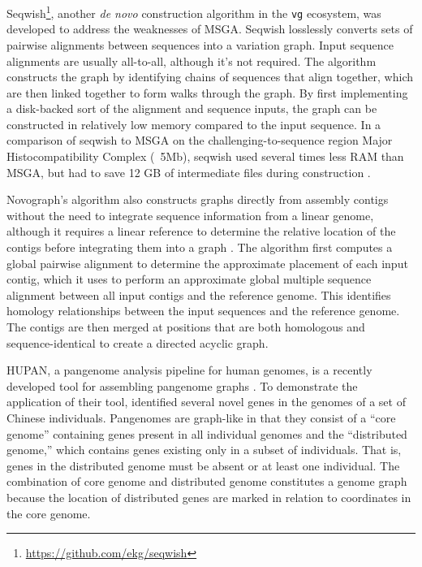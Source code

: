 Seqwish\footnote{\url{https://github.com/ekg/seqwish}}, another \textit{de novo} construction algorithm in the \texttt{vg} ecosystem, was developed to address the weaknesses of MSGA.
Seqwish losslessly converts sets of pairwise alignments between sequences into a variation graph.
Input sequence alignments are usually all-to-all, although it's not required.
The algorithm constructs the graph by identifying chains of sequences that align together, which are then linked together to form walks through the graph.
By first implementing a disk-backed sort of the alignment and sequence inputs, the graph can be constructed in relatively low memory compared to the input sequence.
In a comparison of seqwish to MSGA on the challenging-to-sequence region Major Histocompatibility Complex (~5Mb), seqwish used several times less RAM than MSGA, but had to save 12 GB of intermediate files during construction .


Novograph's algorithm also constructs graphs directly from assembly contigs without the need to integrate sequence information from a linear genome, although it requires a linear reference to determine the relative location of the contigs before integrating them into a graph \cite{Biederstedt2018}. 
The algorithm first computes a global pairwise alignment to determine the approximate placement of each input contig, which it uses to perform an approximate global multiple sequence alignment between all input contigs and the reference genome.
This identifies homology relationships between the input sequences and the reference genome.
The contigs are then merged at positions that are both homologous and sequence-identical to create a directed acyclic graph.

 
HUPAN, a pangenome analysis pipeline for human genomes, is a recently developed tool for assembling pangenome graphs \cite{Duan_2019}. 
To demonstrate the application of their tool, \citep{Duan_2019} identified several novel genes in the genomes of a set of Chinese individuals.
Pangenomes are graph-like in that they consist of a ``core genome'' containing genes present in all individual genomes and the ``distributed genome,'' which contains genes existing only in a subset of individuals.
That is, genes in the distributed genome must be absent or at least one individual.
The combination of core genome and distributed genome constitutes a genome graph because the location of distributed genes are marked in relation to coordinates in the core genome.

